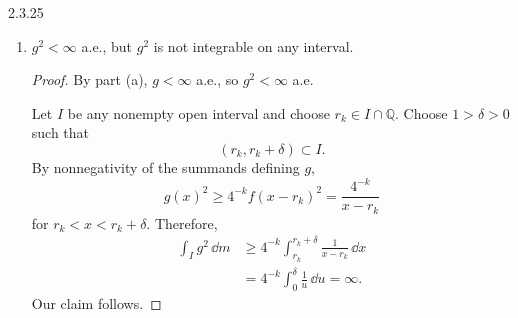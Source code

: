 \documentclass[11pt]{article}
\begin{document}
\begin{problem}{2.3.25}
\begin{enumerate}[label=(\alph*)]
\begin{proof}
            Moreover, the set on which \( g>M \) has positive measure in every nonempty open interval.
            Consequently, if \( \widetilde g=g \) outside a null set \( N \), then
            \begin{equation}
              \label{eq:p3-modification}
              (r_k,r_k+\eta)\setminus N\neq\emptyset,
            \end{equation}
            so \( \widetilde g \) is also unbounded on every interval.

            A real-valued function continuous at a point is bounded in some neighborhood of that point. Since \( g \), and every modification of \( g \) on a null set, is unbounded in every neighborhood of every point, none can be continuous at any point.
          \end{proof}

    \item \( g^2<\infty \) a.e., but \( g^2 \) is not integrable on any interval.
          \begin{proof}
            By part (a), \( g<\infty \) a.e., so \( g^2<\infty \) a.e.

            Let \( I \) be any nonempty open interval and choose \( r_k\in I\cap\mathbb{Q} \).
            Choose \( 1>\delta>0 \) such that
            \begin{equation}
              \label{eq:p3-square-interval}
              (r_k,r_k+\delta)\subset I.
            \end{equation}
            By nonnegativity of the summands defining \( g \),
            \begin{equation}
              \label{eq:p3-square-bound}
              g(x)^2\geq 4^{-k}f(x-r_k)^2
              =\frac{4^{-k}}{x-r_k}
            \end{equation}
            for \( r_k<x<r_k+\delta \). Therefore,
            \begin{equation}
              \label{eq:p3-square-divergence}
              \begin{aligned}
                \int_I g^2\,\dd{m}
                &\geq 4^{-k}
                \int_{r_k}^{r_k+\delta}
                \frac{1}{x-r_k}\,\dd{x}\\
                &=4^{-k}\int_0^\delta\frac{1}{u}\,\dd{u}
                =\infty.
              \end{aligned}
            \end{equation}
            Our claim follows.
          \end{proof}
  \end{enumerate}
\end{problem}
\end{document}
